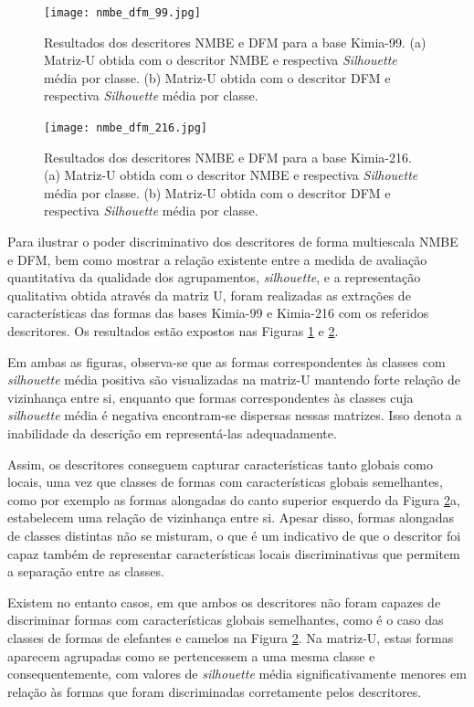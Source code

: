 \begin{figure}[t]
 \caption{\label{fig:nmbe_dfm_99} Resultados dos descritores \ac{NMBE} e \ac{DFM} para a base Kimia-99. (a) Matriz-U obtida com o descritor \ac{NMBE} e respectiva \textit{Silhouette} média por classe. (b) Matriz-U obtida com o descritor \ac{DFM} e respectiva \textit{Silhouette} média por classe.}
  \centering
  \texttt{[image: nmbe\_dfm\_99.jpg]}
\end{figure}

\begin{figure}[t]
 \caption{\label{fig:nmbe_dfm_216} Resultados dos descritores \ac{NMBE} e \ac{DFM} para a base Kimia-216. (a) Matriz-U obtida com o descritor \ac{NMBE} e respectiva \textit{Silhouette} média por classe. (b) Matriz-U obtida com o descritor \ac{DFM} e respectiva \textit{Silhouette} média por classe.}
  \centering
  \texttt{[image: nmbe\_dfm\_216.jpg]}
\end{figure}

Para ilustrar o poder discriminativo dos descritores de forma multiescala \ac{NMBE} e \ac{DFM}, bem como mostrar a relação existente entre a medida de avaliação quantitativa da qualidade dos agrupamentos, \emph{silhouette}, e a representação qualitativa obtida através da matriz U, foram realizadas as extrações de características das formas das bases Kimia-99 e Kimia-216 com os referidos descritores. Os resultados estão expostos nas Figuras \ref{fig:nmbe_dfm_99} e \ref{fig:nmbe_dfm_216}. 

Em ambas as figuras, observa-se que as formas correspondentes às classes com  \emph{silhouette} média positiva são visualizadas na matriz-U mantendo forte relação de vizinhança entre si, enquanto que formas correspondentes às classes cuja \emph{silhouette} média é negativa encontram-se dispersas nessas matrizes. Isso denota a inabilidade da descrição  em representá-las adequadamente.

Assim, os descritores conseguem capturar características tanto globais como locais, uma vez que classes de formas com características globais semelhantes, como por exemplo as formas alongadas do canto superior esquerdo da Figura \ref{fig:nmbe_dfm_216}a, estabelecem uma relação de vizinhança entre si. Apesar disso, formas alongadas de classes distintas não se misturam, o que é um indicativo de que o descritor foi capaz também de representar características locais discriminativas que permitem a separação entre as classes.

Existem no entanto casos, em que ambos os descritores não foram capazes de discriminar formas com características globais semelhantes, como é o caso das classes de formas de elefantes e camelos na Figura \ref{fig:nmbe_dfm_216}. Na matriz-U, estas formas aparecem agrupadas como se pertencessem a uma mesma classe e consequentemente, com valores de \emph{silhouette} média significativamente menores em relação às formas que foram discriminadas corretamente pelos descritores.

